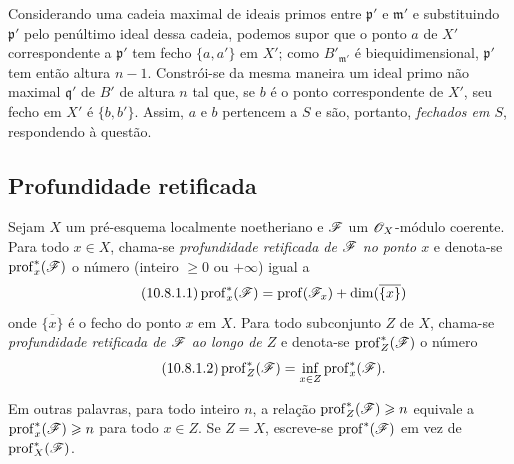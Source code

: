\begin{env}[10.7.3]
Considerando uma cadeia maximal de ideais primos entre $\mathfrak p'$ e $\mathfrak m'$ e substituindo $\mathfrak p'$ pelo penúltimo ideal dessa cadeia, podemos supor que o ponto $a$ de $X'$ correspondente a $\mathfrak p'$ tem fecho $\{a,a'\}$ em $X'$; como $B'_{\mathfrak m'}$ é biequidimensional, $\mathfrak p'$ tem então altura $n-1$.
Constrói-se da mesma maneira um ideal primo não maximal $\mathfrak q'$ de $B'$ de altura $n$ tal que, se $b$ é o ponto correspondente de $X'$, seu fecho em $X'$ é $\{b,b'\}$.
Assim, $a$ e $b$ pertencem a $S$ e são, portanto, \emph{fechados em $S$}, respondendo à questão.
\end{env}

\subsection{Profundidade retificada}
\label{subsection:IV.10.8}

\begin{definition}[10.8.1]
\label{IV.10.8.1}
Sejam $X$ um pré-esquema localmente noetheriano e $\mathscr{F}$ um $\mathscr{O}_X$-módulo coerente.
Para todo $x\in X$, chama-se \emph{profundidade retificada de $\mathscr{F}$ no ponto $x$} e denota-se $\operatorname{prof}^{*}_{x}(\mathscr{F})$ o número (inteiro $\geq0$ ou $+\infty$) igual a
\begin{equation}
\label{IV.10.8.1.1}
\tag{10.8.1.1}
\operatorname{prof}^{*}_{x}(\sh{F})
=\operatorname{prof}(\sh{F}_x)+\dim(\overline{\{x\}})
\end{equation}
onde $\overline{\{x\}}$ é o fecho do ponto $x$ em $X$.
Para todo subconjunto $Z$ de $X$, chama-se \emph{profundidade retificada de $\mathscr{F}$ ao longo de $Z$} e denota-se $\operatorname{prof}^{*}_{Z}(\mathscr{F})$ o número
\begin{equation}
\label{IV.10.8.1.2}
\tag{10.8.1.2}
\operatorname{prof}^{*}_{Z}(\sh{F})
=\inf_{x\in Z}\operatorname{prof}^{*}_{x}(\sh{F}).
\end{equation}
\end{definition}

Em outras palavras, para todo inteiro $n$, a relação $\operatorname{prof}^{*}_{Z}(\mathscr{F})\geqslant n$ equivale a $\operatorname{prof}^{*}_{x}(\mathscr{F})\geqslant n$ para todo $x\in Z$.
Se $Z=X$, escreve-se $\operatorname{prof}^{*}(\mathscr{F})$ em vez de $\operatorname{prof}^{*}_{X}(\mathscr{F})$.

